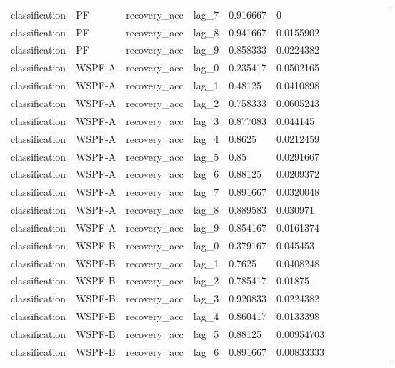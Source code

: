 \begin{tabular}{llllllllllll}
classification & PF & recovery\_acc & lag\_7 & 0.916667 & 0 &  &  &  &  &  &  \\
classification & PF & recovery\_acc & lag\_8 & 0.941667 & 0.0155902 &  &  &  &  &  &  \\
classification & PF & recovery\_acc & lag\_9 & 0.858333 & 0.0224382 &  &  &  &  &  &  \\
classification & WSPF-A & recovery\_acc & lag\_0 & 0.235417 & 0.0502165 &  &  &  &  &  &  \\
classification & WSPF-A & recovery\_acc & lag\_1 & 0.48125 & 0.0410898 &  &  &  &  &  &  \\
classification & WSPF-A & recovery\_acc & lag\_2 & 0.758333 & 0.0605243 &  &  &  &  &  &  \\
classification & WSPF-A & recovery\_acc & lag\_3 & 0.877083 & 0.044145 &  &  &  &  &  &  \\
classification & WSPF-A & recovery\_acc & lag\_4 & 0.8625 & 0.0212459 &  &  &  &  &  &  \\
classification & WSPF-A & recovery\_acc & lag\_5 & 0.85 & 0.0291667 &  &  &  &  &  &  \\
classification & WSPF-A & recovery\_acc & lag\_6 & 0.88125 & 0.0209372 &  &  &  &  &  &  \\
classification & WSPF-A & recovery\_acc & lag\_7 & 0.891667 & 0.0320048 &  &  &  &  &  &  \\
classification & WSPF-A & recovery\_acc & lag\_8 & 0.889583 & 0.030971 &  &  &  &  &  &  \\
classification & WSPF-A & recovery\_acc & lag\_9 & 0.854167 & 0.0161374 &  &  &  &  &  &  \\
classification & WSPF-B & recovery\_acc & lag\_0 & 0.379167 & 0.045453 &  &  &  &  &  &  \\
classification & WSPF-B & recovery\_acc & lag\_1 & 0.7625 & 0.0408248 &  &  &  &  &  &  \\
classification & WSPF-B & recovery\_acc & lag\_2 & 0.785417 & 0.01875 &  &  &  &  &  &  \\
classification & WSPF-B & recovery\_acc & lag\_3 & 0.920833 & 0.0224382 &  &  &  &  &  &  \\
classification & WSPF-B & recovery\_acc & lag\_4 & 0.860417 & 0.0133398 &  &  &  &  &  &  \\
classification & WSPF-B & recovery\_acc & lag\_5 & 0.88125 & 0.00954703 &  &  &  &  &  &  \\
classification & WSPF-B & recovery\_acc & lag\_6 & 0.891667 & 0.00833333 &  &  &  &  &  &  \\

\end{tabular}
